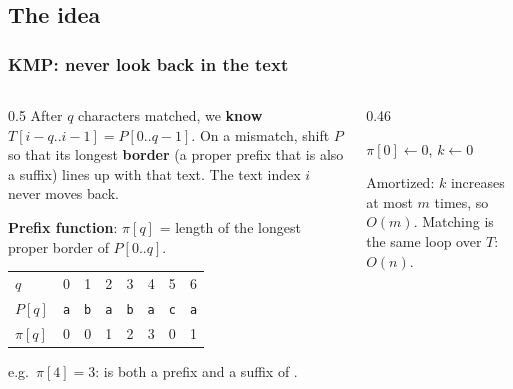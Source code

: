 \documentclass[aspectratio=169,10pt,compress]{beamer}
\begin{document}

\subsection[Idea]{The idea}




\begin{frame}[t,fragile] \frametitle{KMP: never look back in the text}
  \begin{columns}[T]
    \begin{column}{0.5\textwidth}
      \small After $q$ characters matched, we \textbf{know} $T[i-q..i-1] = P[0..q-1]$.
      On a mismatch, shift $P$ so that its longest \textbf{border} (a proper prefix that is also a suffix)
      lines up with that text. The text index $i$ never moves back.

      \vspace{0.4em}
      \textbf{Prefix function}: $\pi[q]$ = length of the longest proper border of $P[0..q]$.
      \vspace{0.4em}

      \begin{tabular}{@{}l*{7}{c}@{}}
        \toprule
        $q$      & 0 & 1 & 2 & 3 & 4 & 5 & 6 \\
        $P[q]$   & \texttt{a} & \texttt{b} & \texttt{a} & \texttt{b} & \texttt{a} & \texttt{c} & \texttt{a} \\
        $\pi[q]$ & 0 & 0 & 1 & 2 & 3 & 0 & 1 \\
        \bottomrule
      \end{tabular}

      \vspace{0.3em}
      \footnotesize e.g.\ $\pi[4] = 3$:  is both a prefix and a suffix of .
    \end{column}
    \begin{column}{0.46\textwidth}
 

\SetAlFnt{\small}

\begin{algorithm}[H]
  \caption{PrefixFunction($P$)}
  $\pi[0] \leftarrow 0$, \quad $k \leftarrow 0$\;
  \Return{$\pi$}\;
\end{algorithm}


      \small Amortized: $k$ increases at most $m$ times, so $O(m)$. Matching is the same loop over $T$: $O(n)$.
    \end{column}
  \end{columns}
\end{frame}
\end{document}
